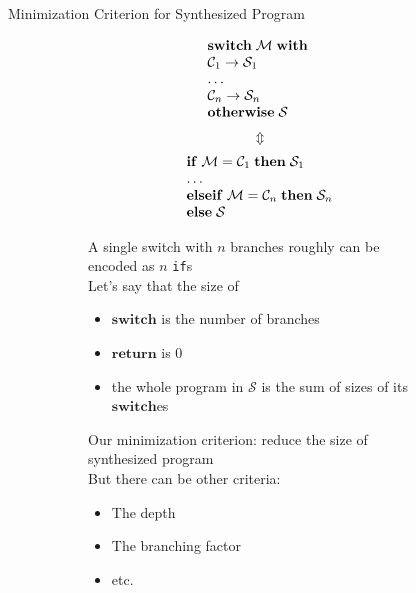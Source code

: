 \documentclass[aspectratio=169
  , xcolor={svgnames}
  , hyperref={ colorlinks,citecolor=Blue
             , linkcolor=DarkRed,urlcolor=DarkBlue}
  , russian
  ]{beamer}
\newcommand{\primi}[1]{\mathbf{#1}}
\newcommand{\ir}{\ensuremath{\mathcal{S}}}
\begin{document}
\begin{frame}[fragile]{Minimization Criterion for Synthesized Program}
\begin{figure}
\begin{subfigure}[b]{0.3\linewidth}
$$
\begin{array}{l}
\primi{switch}\;\mathcal{M}\;\primi{with}\; \\
\mathcal{C}_1\; \primi{\rightarrow}\; \ir_1\\
\dots \\
\mathcal{C}_n\; \primi{\rightarrow}\; \ir_n\\
\primi{otherwise}\;\ir\\
\end{array}\\
$$
$$
\Updownarrow
$$
$$
\begin{array}{l}
\primi{if}\; \mathcal{M} = \mathcal{C}_1\;\primi{then}\; \ir_1\\
\dots \\
\primi{else if}\; \mathcal{M} = \mathcal{C}_n\; \primi{then}\;  \ir_n\\
\primi{else}\;\ir\\
\end{array}\\
$$
\vspace{1cm}

\end{subfigure}
\hspace{1cm}
\begin{subfigure}[b]{0.6\linewidth}
A single switch with $n$ branches roughly can be encoded as $n$ \texttt{if}s\\

Let's say that the size of
\begin{itemize}
\item  $\primi{switch}$ is the number of branches
\item $\primi{return}$ is 0
\item the whole program in $\ir$ is the sum of sizes of its $\primi{switch}$es 
\end{itemize}
Our minimization criterion: reduce the size of synthesized program\\

But there can be other criteria:
\begin{itemize}
\item The  depth 
\item The branching factor
\item etc.
\end{itemize}
\end{subfigure}
\end{figure}

\end{frame}
\end{document}
